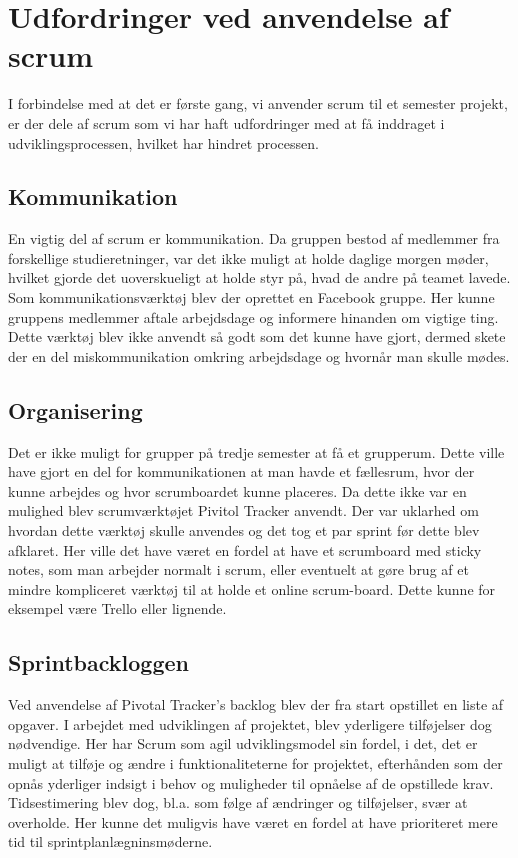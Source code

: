 \chapter{Udfordringer ved anvendelse af scrum}
I forbindelse med at det er første gang, vi anvender scrum til et semester projekt, er der dele af scrum som vi har haft udfordringer med at få inddraget i udviklingsprocessen, hvilket har hindret processen.

\section{Kommunikation}
En vigtig del af scrum er kommunikation. Da gruppen bestod af medlemmer fra forskellige studieretninger, var det ikke muligt at holde daglige morgen møder, hvilket gjorde det uoverskueligt at holde styr på, hvad de andre på teamet lavede. Som kommunikationsværktøj blev der oprettet en Facebook gruppe. Her kunne gruppens medlemmer aftale arbejdsdage og informere hinanden om vigtige ting. Dette værktøj blev ikke anvendt så godt som det kunne have gjort, dermed skete der en del miskommunikation omkring arbejdsdage og hvornår man skulle mødes. \par

\section{Organisering}
Det er ikke muligt for grupper på tredje semester at få et grupperum. Dette ville have gjort en del for kommunikationen at man havde et fællesrum, hvor der kunne arbejdes og hvor scrumboardet kunne placeres. Da dette ikke var en mulighed blev scrumværktøjet Pivitol Tracker anvendt. Der var uklarhed om hvordan dette værktøj skulle anvendes og det tog et par sprint før dette blev afklaret. Her ville det have været en fordel at have et scrumboard med sticky notes, som man arbejder normalt i scrum, eller eventuelt at gøre brug af et mindre kompliceret værktøj til at holde et online scrum-board. Dette kunne for eksempel være Trello eller lignende. 

\section{Sprintbackloggen}
Ved anvendelse af Pivotal Tracker's backlog blev der fra start opstillet en liste af opgaver. I arbejdet med udviklingen af projektet, blev yderligere tilføjelser dog nødvendige. Her har Scrum som agil udviklingsmodel sin fordel, i det, det er muligt at tilføje og ændre i funktionaliteterne for projektet, efterhånden som der opnås yderliger indsigt i behov og muligheder til opnåelse af de opstillede krav. Tidsestimering blev dog, bl.a. som følge af ændringer og tilføjelser, svær at overholde. Her kunne det muligvis have været en fordel at have prioriteret mere tid til sprintplanlægninsmøderne. 

